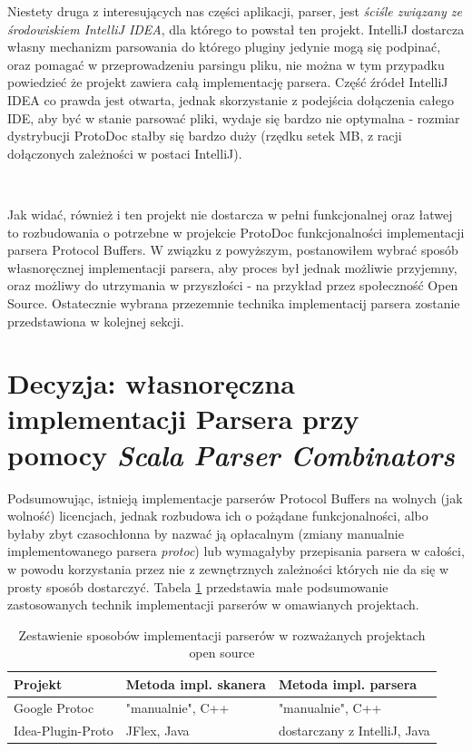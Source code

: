\documentclass[pdflatex,11pt]{aghdpl}
\begin{document}
Niestety druga z interesujących nas części aplikacji, parser, jest \textit{ściśle związany ze środowiskiem IntelliJ IDEA}, dla którego to powstał ten projekt.
IntelliJ dostarcza własny mechanizm parsowania do którego pluginy jedynie mogą się podpinać, oraz pomagać w przeprowadzeniu parsingu pliku, nie można w tym przypadku
powiedzieć że projekt zawiera całą implementację parsera. Część źródeł IntelliJ IDEA co prawda jest otwarta, jednak skorzystanie z podejścia dołączenia całego IDE,
aby być w stanie parsować pliki, wydaje się bardzo nie optymalna - rozmiar dystrybucji ProtoDoc stałby się bardzo duży (rzędku setek MB, z racji dołączonych 
zależności w postaci IntelliJ).

~\\\*

Jak widać, również i ten projekt nie dostarcza w pełni funkcjonalnej oraz łatwej to rozbudowania o potrzebne w projekcie ProtoDoc funkcjonalności implementacji parsera
Protocol Buffers. W związku z powyższym, postanowiłem wybrać sposób własnoręcznej implementacji parsera, aby proces był jednak możliwie przyjemny, oraz
możliwy do utrzymania w przyszłości - na przykład przez społeczność Open Source. Ostatecznie wybrana przezemnie technika implementacij parsera 
zostanie przedstawiona w kolejnej sekcji.



\section{Decyzja: własnoręczna implementacji Parsera przy pomocy \textit{Scala Parser Combinators}}
\label{sec:wybor_parsera}

Podsumowując, istnieją implementacje parserów Protocol Buffers na wolnych (jak wolność) licencjach, jednak rozbudowa ich o pożądane funkcjonalności,
albo byłaby zbyt czasochłonna by nazwać ją opłacalnym (zmiany manualnie implementowanego parsera \textit{protoc}) lub wymagałyby 
przepisania parsera w całości, w powodu korzystania przez nie z zewnętrznych zależności których nie da się w prosty sposób dostarczyć.
Tabela \ref{tab:parers} przedstawia małe podsumowanie zastosowanych technik implementacji parserów w omawianych projektach.

\begin{table}[ch]
  \begin{center}
    \begin{tabular}{| l | l | l |}
      \hline
      Projekt & Metoda impl. skanera & Metoda impl. parsera\\
      \hline
      Google Protoc & "manualnie", C++ & "manualnie", C++\\
      \hline
      Idea-Plugin-Proto & JFlex, Java & dostarczany z IntelliJ, Java\\
      \hline
    \end{tabular}
    \caption{Zestawienie sposobów implementacji parserów w rozważanych projektach open source}
  \end{center}
  \label{tab:parers}
\end{table}
\end{document}

